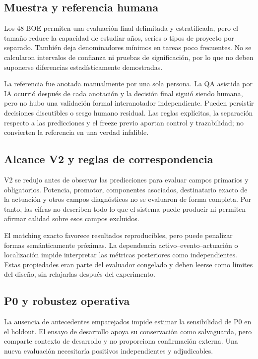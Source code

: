 \subsection{Muestra y referencia humana}
Los 48 BOE permiten una evaluación final delimitada y estratificada, pero el
tamaño reduce la capacidad de estudiar años, series o tipos de proyecto por
separado. También deja denominadores mínimos en tareas poco frecuentes. No se
calcularon intervalos de confianza ni pruebas de significación, por lo que no
deben suponerse diferencias estadísticamente demostradas.

La referencia fue anotada manualmente por una sola persona. La QA asistida por
IA ocurrió después de cada anotación y la decisión final siguió siendo humana,
pero no hubo una validación formal interanotador independiente. Pueden persistir
decisiones discutibles o sesgo humano residual. Las reglas explícitas, la
separación respecto a las predicciones y el freeze previo aportan control y
trazabilidad; no convierten la referencia en una verdad infalible.

\subsection{Alcance V2 y reglas de correspondencia}
V2 se redujo antes de observar las predicciones para evaluar campos primarios
y obligatorios. Potencia, promotor, componentes asociados, destinatario exacto
de la actuación y otros campos diagnósticos no se evaluaron de forma completa.
Por tanto, las cifras no describen todo lo que el sistema puede producir ni
permiten afirmar calidad sobre esos campos excluidos.

El matching exacto favorece resultados reproducibles, pero puede penalizar
formas semánticamente próximas. La dependencia activo--evento--actuación o
localización impide interpretar las métricas posteriores como independientes.
Estas propiedades eran parte del evaluador congelado y deben leerse como
límites del diseño, sin relajarlas después del experimento.

\subsection{P0 y robustez operativa}
La ausencia de antecedentes emparejados impide estimar la sensibilidad de P0
en el holdout. El ensayo de desarrollo apoya su conservación como salvaguarda,
pero comparte contexto de desarrollo y no proporciona confirmación externa.
Una nueva evaluación necesitaría positivos independientes y adjudicables.

